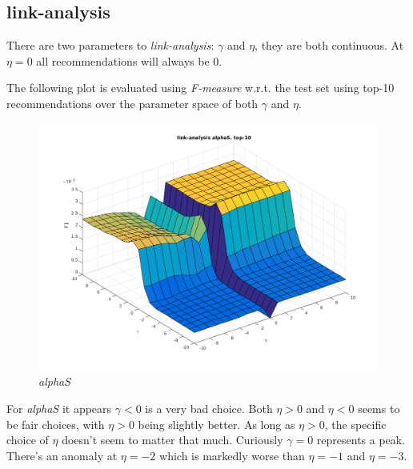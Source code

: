 
\subsection{link-analysis}

There are two parameters to \textit{link-analysis}: $\gamma$ and $\eta$, they are both continuous. At $\eta = 0$ all recommendations will always be 0.

The following plot is evaluated using \textit{F-measure} w.r.t. the test set using top-10 recommendations over the parameter space of both $\gamma$ and $\eta$.

\begin{figure}[h!]
    \includegraphics[width=\textwidth]{fig/link_eta_gamma/alphaS_link.png}
    \caption{\textit{alphaS}}
    \label{fig:linkalphaS}
\end{figure}

For \textit{alphaS} it appears $\gamma < 0$ is a very bad choice. Both $\eta > 0$ and $\eta < 0$ seems to be fair choices, with $\eta > 0$ being slightly better. As long as $\eta > 0$, the specific choice of $\eta$ doesn't seem to matter that much. Curiously $\gamma = 0$ represents a peak. There's an anomaly at $\eta = -2$ which is markedly worse than $\eta = -1$ and $\eta = -3$.

